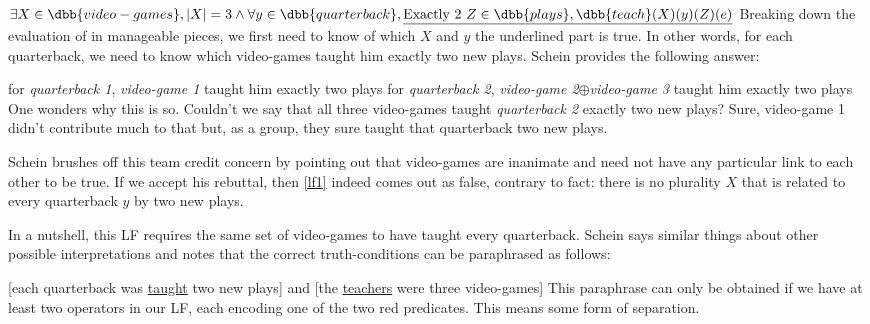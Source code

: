 \documentclass[english]{article}
\begin{document}
\ex\label{lf1}
$\exists X\in \dbb{video-games}, |X| = 3 \wedge \forall y\in \dbb{quarterback}, \underline{\text{Exactly 2 } Z\in \dbb{plays},  \dbb{teach}(X)(y)(Z)(e)}$
\xe
%
Breaking down the evaluation of \clastx in manageable pieces, we first need to know of which $X$ and $y$ the underlined part is true. In other words, for each quarterback, we need to know which video-games taught him exactly two new plays. Schein provides the following answer:

\pex
\a for \emph{quarterback 1}, \emph{video-game 1} taught him exactly two plays
\a for \emph{quarterback 2}, \emph{video-game 2}$\oplus$\emph{video-game 3} taught him exactly two plays
\xe
%
One wonders why this is so. Couldn't we say that all three video-games taught \emph{quarterback 2} exactly two new plays? Sure, video-game 1 didn't contribute much to that but, as a group, they sure taught that quarterback two new plays.

Schein brushes off this team credit concern by pointing out that video-games are inanimate and need not have any particular link to each other to be true\footnotemark{}. If we accept his rebuttal, then \cref{lf1} indeed comes out as false, contrary to fact: there is no plurality $X$ that is related to every quarterback $y$ by two new plays.

In a nutshell, this LF requires the same set of video-games to have taught every quarterback. Schein says similar things about other possible interpretations and notes that the correct truth-conditions can be paraphrased as follows:

\ex{}%
[each quarterback was \underline{taught} two new plays] and [the \underline{teachers} were three video-games]
\xe
%
This paraphrase can only be obtained if we have at least two operators in our LF, each encoding one of the two red predicates. This means some form of separation.
\end{document}
